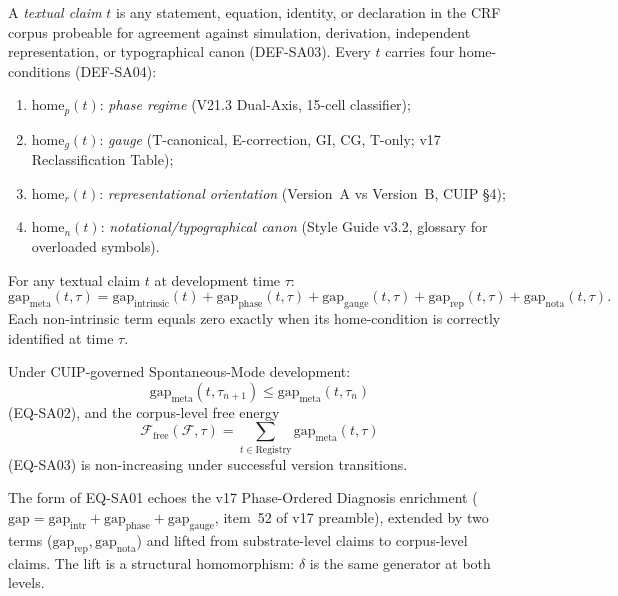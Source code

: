\documentclass[12pt, a4paper]{article}
\begin{document}
\begin{formalbox}[title={DEF-SA03 / DEF-SA04: Textual Claim and its Home-Conditions}]
A \emph{textual claim} $t$ is any statement, equation, identity, or
declaration in the CRF corpus probeable for agreement against
simulation, derivation, independent representation, or typographical
canon (DEF-SA03). Every $t$ carries four home-conditions (DEF-SA04):
\begin{enumerate}[leftmargin=*]
\item $\mathrm{home}_p(t)$: \emph{phase regime} (V21.3 Dual-Axis,
15-cell classifier);
\item $\mathrm{home}_g(t)$: \emph{gauge} (T-canonical, E-correction,
GI, CG, T-only; v17 Reclassification Table);
\item $\mathrm{home}_r(t)$: \emph{representational orientation}
(Version~A vs Version~B, CUIP §4);
\item $\mathrm{home}_n(t)$: \emph{notational/typographical canon}
(Style Guide v3.2, glossary for overloaded symbols).
\end{enumerate}
\end{formalbox}

\begin{formalbox}[title={EQ-SA01: Decomposition of the Meta-Gap}]
For any textual claim $t$ at development time $\tau$:
\[
  \mathrm{gap}_{\mathrm{meta}}(t, \tau) =
  \mathrm{gap}_{\mathrm{intrinsic}}(t) +
  \mathrm{gap}_{\mathrm{phase}}(t, \tau) +
  \mathrm{gap}_{\mathrm{gauge}}(t, \tau) +
  \mathrm{gap}_{\mathrm{rep}}(t, \tau) +
  \mathrm{gap}_{\mathrm{nota}}(t, \tau).
\]
Each non-intrinsic term equals zero exactly when its home-condition
is correctly identified at time $\tau$.
\end{formalbox}

\begin{formalbox}[title={EQ-SA02 / EQ-SA03: Time-Evolution and Free Energy}]
Under CUIP-governed Spontaneous-Mode development:
\[
  \mathrm{gap}_{\mathrm{meta}}(t, \tau_{n+1}) \le
  \mathrm{gap}_{\mathrm{meta}}(t, \tau_n)
\]
(EQ-SA02), and the corpus-level free energy
\[
  \mathcal{F}_{\mathrm{free}}(\mathcal{F}, \tau) =
  \sum_{t \in \mathrm{Registry}} \mathrm{gap}_{\mathrm{meta}}(t, \tau)
\]
(EQ-SA03) is non-increasing under successful version transitions.
\end{formalbox}

\begin{keybox}[title={The structural symmetry}]
The form of EQ-SA01 echoes the v17 Phase-Ordered Diagnosis
enrichment ($\mathrm{gap} = \mathrm{gap}_{\mathrm{intr}} +
\mathrm{gap}_{\mathrm{phase}} + \mathrm{gap}_{\mathrm{gauge}}$,
item~52 of v17 preamble), extended by two terms
($\mathrm{gap}_{\mathrm{rep}}, \mathrm{gap}_{\mathrm{nota}}$) and
lifted from substrate-level claims to corpus-level claims. The lift
is a structural homomorphism: $\delta$ is the same generator at both
levels.
\end{keybox}
\end{document}

